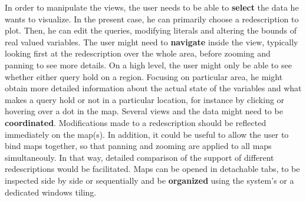     In order to manipulate the views, the user needs to be
able to \textbf{select} the data he wants to visualize. In the present
case, he can primarily choose a redescription to plot. Then, he can
edit the queries, modifying literals and altering the bounds of real
valued variables.  The user might need to \textbf{navigate} inside the
view, typically looking first at the redescription over the whole
area, before zooming and panning to see more details. On a high level,
the user might only be able to see whether either query hold on a
region. Focusing on particular area, he might obtain more detailed
information about the actual state of the variables and what makes a
query hold or not in a particular location, for instance by clicking
or hovering over a dot in the map. Several views and the data might
need to be \textbf{coordinated}.  Modifications made to a
redescription should be reflected immediately on the map(s). In
addition, it could be useful to allow the user to bind maps together,
so that panning and zooming are applied to all maps simultaneouly. In
that way, detailed comparison of the support of different
redescriptions would be facilitated.  Maps can be opened in detachable
tabs, to be inspected side by side or sequentially and be
\textbf{organized} using the system's or a dedicated windows tiling.

